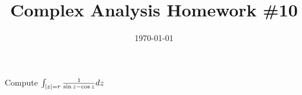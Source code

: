 \documentclass{article}
\date{\today}
\title{Complex Analysis Homework \#10}
\begin{document}
\maketitle

\begin{prob}
    Compute $\int_{\left\lvert z \right\rvert=r} \frac{1}{\sin z - \cos z} dz$
\end{prob}
\end{document}
